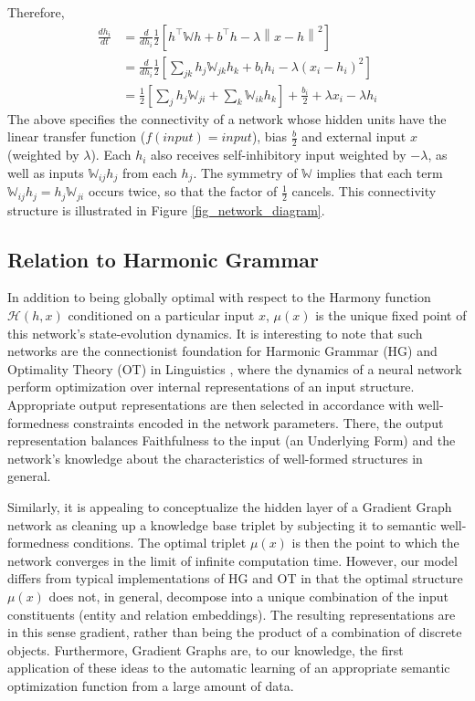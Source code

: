 \documentclass[a4paper,10pt]{article}
\newcommand{\norm}[1]{\left\lVert #1 \right\rVert}
\begin{document}
Therefore, 
\begin{align*}
\frac{d h_i}{dt} &= \frac{d}{dh_i} \frac{1}{2} \left[h^\top \mathbb{W} h + b^\top h - \lambda \norm{x - h}^2 \right] \\
	&= \frac{d}{dh_i} \frac{1}{2} \left[ \sum_{jk} h_j\mathbb{W}_{jk}h_k + b_ih_i - \lambda (x_i - h_i)^2 \right] \\
	&= \frac{1}{2} \left[ \sum_j h_j \mathbb{W}_{ji} + \sum_k \mathbb{W}_{ik} h_k \right] + \frac{b_i}{2} + \lambda x_i - \lambda h_i 
\end{align*}
The above specifies the connectivity of a network whose hidden units have the linear transfer function ($f(input) = input$), bias $\frac{b}{2}$ and external input $x$ (weighted by $\lambda$). Each $h_i$ also receives self-inhibitory input weighted by $-\lambda$, as well as inputs $\mathbb{W}_{ij} h_j$ from each $h_j$. The symmetry of $\mathbb{W}$ implies that each term $\mathbb{W}_{ij}h_j = h_j\mathbb{W}_{ji}$ occurs twice, so that the factor of $\frac{1}{2}$ cancels. This connectivity structure is illustrated in Figure \ref{fig_network_diagram}. 

\subsection{Relation to Harmonic Grammar}
In addition to being globally optimal with respect to the Harmony function $\mathcal{H}(h,x)$ conditioned on a particular input $x$, $\mu(x)$ is the unique fixed point of this network's state-evolution dynamics. It is interesting to note that such networks are the connectionist foundation for Harmonic Grammar (HG) and Optimality Theory (OT) in Linguistics \cite{smolensky_legendre2006harmonic_mind}, where the dynamics of a neural network perform optimization over internal representations of an input structure. Appropriate output representations are then selected in accordance with well-formedness constraints encoded in the network parameters. There, the output representation balances Faithfulness to the input (an Underlying Form) and the network's knowledge about the characteristics of well-formed structures in general. 

Similarly, it is appealing to conceptualize the hidden layer of a Gradient Graph network as cleaning up a knowledge base triplet by subjecting it to semantic well-formedness conditions. The optimal triplet $\mu(x)$ is then the point to which the network converges in the limit of infinite computation time. However, our model differs from typical implementations of HG and OT in that the optimal structure $\mu(x)$ does not, in general, decompose into a unique combination of the input constituents (entity and relation embeddings). The resulting representations are in this sense gradient, rather than being the product of a combination of discrete objects. Furthermore, Gradient Graphs are, to our knowledge, the first application of these ideas to the automatic learning of an appropriate semantic optimization function from a large amount of data.
\end{document}
